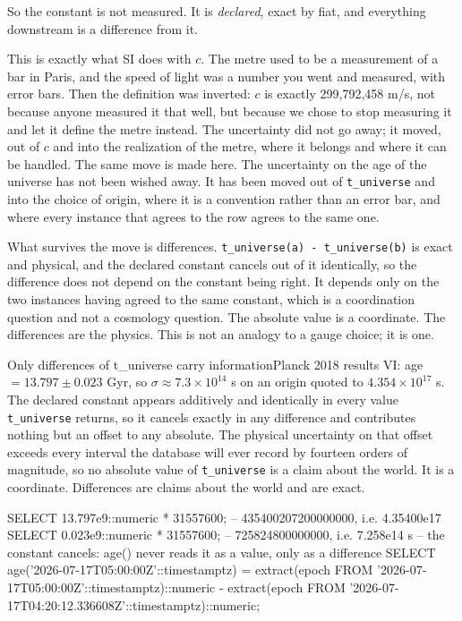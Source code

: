 So the constant is not measured. It is \emph{declared}, exact by fiat, and everything downstream is a difference from it.

This is exactly what SI does with $c$. The metre used to be a measurement of a bar in Paris, and the speed of light was a number you went and measured, with error bars. Then the definition was inverted: $c$ is exactly 299{,}792{,}458 m/s, not because anyone measured it that well, but because we chose to stop measuring it and let it define the metre instead. The uncertainty did not go away; it moved, out of $c$ and into the realization of the metre, where it belongs and where it can be handled. The same move is made here. The uncertainty on the age of the universe has not been wished away. It has been moved out of \texttt{t\_universe} and into the choice of origin, where it is a convention rather than an error bar, and where every instance that agrees to the row agrees to the same one.

What survives the move is differences. \texttt{t\_universe(a) - t\_universe(b)} is exact and physical, and the declared constant cancels out of it identically, so the difference does not depend on the constant being right. It depends only on the two instances having agreed to the same constant, which is a coordination question and not a cosmology question. The absolute value is a coordinate. The differences are the physics. This is not an analogy to a gauge choice; it is one.

\begin{Theorem}{Only differences of t\_universe carry information}{Planck 2018 results VI: age $= 13.797 \pm 0.023$ Gyr, so $\sigma \approx 7.3 \times 10^{14}$ s on an origin quoted to $4.354 \times 10^{17}$ s.}
The declared constant appears additively and identically in every value \texttt{t\_universe} returns, so it cancels exactly in any difference and contributes nothing but an offset to any absolute. The physical uncertainty on that offset exceeds every interval the database will ever record by fourteen orders of magnitude, so no absolute value of \texttt{t\_universe} is a claim about the world. It is a coordinate. Differences are claims about the world and are exact.
\begin{Check}
SELECT 13.797e9::numeric * 31557600;  -- 435400207200000000, i.e. 4.35400e17
SELECT 0.023e9::numeric * 31557600;   --    725824800000000, i.e. 7.258e14 s
-- the constant cancels: age() never reads it as a value, only as a difference
SELECT age('2026-07-17T05:00:00Z'::timestamptz)
     = extract(epoch FROM '2026-07-17T05:00:00Z'::timestamptz)::numeric
     - extract(epoch FROM '2026-07-17T04:20:12.336608Z'::timestamptz)::numeric;
\end{Check}
\end{Theorem}

